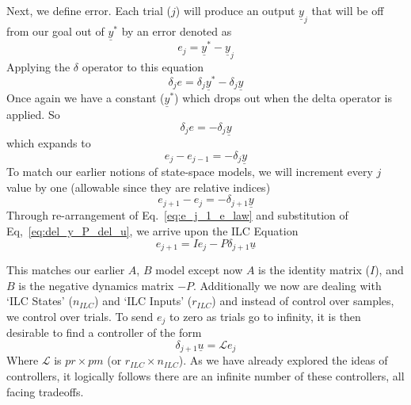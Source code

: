 Next, we define error. Each trial ($j$) will produce an output ${\underline{y}}_j$ that will be off from our goal out of ${\underline{y}}^\ast$ by an error denoted as
\begin{equation}
    e_j={\underline{y}}^\ast-{\underline{y}}_j
    \label{eq:e_j_def}
\end{equation}
Applying the $\delta$ operator to this equation
\begin{equation}
    \delta_j e=\delta_j{\underline{y}}^\ast-\delta_j\underline{y}
    \label{eq:del_e_law_w_star}
\end{equation}
Once again we have a constant (${\underline{y}}^\ast$) which drops out when the delta operator is applied. So 
\begin{equation}
    \delta_j e =-\delta_j \underline{y}
    \label{del_e_law}
\end{equation}
which expands to
\begin{equation}
    e_j-e_{j-1}=-\delta_j\underline{y}
    \label{e_j_e_j_1_law}
\end{equation}
To match our earlier notions of state-space models, we will increment every $j$ value by one (allowable since they are relative indices)
\begin{equation}
    e_{j+1}-e_j=-\delta_{j+1}\underline{y}
    \label{eq:e_j_1_e_law}
\end{equation}
Through re-arrangement of Eq.~\ref{eq:e_j_1_e_law} and substitution of Eq,~\ref{eq:del_y_P_del_u}, we arrive upon the ILC Equation
\begin{equation}
    e_{j+1}=Ie_j-P\delta_{j+1}\underline{u}
    \label{eq:ILC_law}
\end{equation}

This matches our earlier $A$, $B$ model except now $A$ is the identity matrix ($I$), and $B$ is the negative dynamics matrix $-P$. Additionally we now are dealing with `ILC States' ($n_{ILC}$) and `ILC Inputs' ($r_{ILC}$) and instead of control over samples, we control over trials. To send $e_j$ to zero as trials go to infinity, it is then desirable to find a controller of the form
\begin{equation}
    \delta_{j+1}\underline{u}=\mathcal{L}e_j
    \label{eq:del_u_L_e_j}
\end{equation}
Where $\mathcal{L}$ is $pr\times pm$ (or $r_{ILC} \times n_{ILC}$). As we have already explored the ideas of controllers, it logically follows there are an infinite number of these controllers, all facing tradeoffs. 

